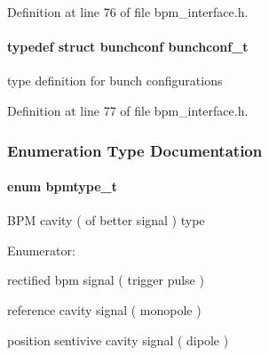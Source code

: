 Definition at line 76 of file bpm\_\-interface.h.
\paragraph[bunchconf\_\-t]{\setlength{\rightskip}{0pt plus 5cm}typedef struct {\bf bunchconf} {\bf bunchconf\_\-t}}\hfill\label{group__interface_gc83290f1666bee3149e4e6f0da967794}


type definition for bunch configurations 

Definition at line 77 of file bpm\_\-interface.h.

\subsubsection{Enumeration Type Documentation}
\paragraph[bpmtype\_\-t]{\setlength{\rightskip}{0pt plus 5cm}enum {\bf bpmtype\_\-t}}\hfill\label{group__interface_gd32da6712e4173dae5874e246e6fee86}


BPM cavity ( of better signal ) type \begin{Desc}
\item[Enumerator: ]\par
\begin{description}
\item[{\em 
diode\label{group__interface_ggd32da6712e4173dae5874e246e6fee86ab471a312e0bebb8eb17826da1c45f5f}
}]rectified bpm signal ( trigger pulse ) \item[{\em 
monopole\label{group__interface_ggd32da6712e4173dae5874e246e6fee866ac4b77de6410320418ac45f8bb41cfa}
}]reference cavity signal ( monopole ) \item[{\em 
dipole\label{group__interface_ggd32da6712e4173dae5874e246e6fee864b63a6b46413b754da191740d5ceb73b}
}]position sentivive cavity signal ( dipole ) \end{description}
\end{Desc}




